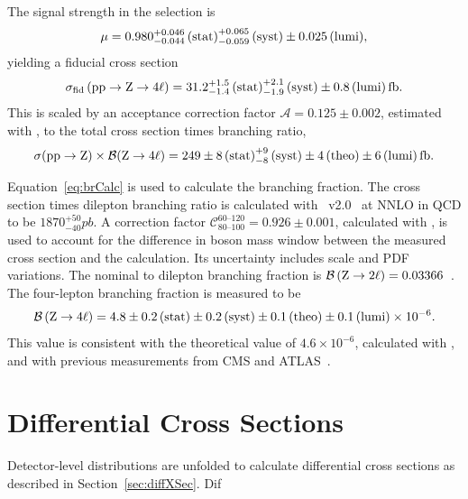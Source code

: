The signal strength in the {\Zfourl} selection is
\begin{equation}
  \mu = 0.980 _{-0.044}^{+0.046} \,\text{(stat)} _{-0.059}^{+0.065} \,\text{(syst)} \pm 0.025 \,\text{(lumi)},
\end{equation}
yielding a fiducial cross section
\begin{equation}
  \sigma_\text{fid}\left(\mathrm{p}\mathrm{p} \to \mathrm{Z} \to 4\ell\right) = 31.2 _{-1.4}^{+1.5} \,\text{(stat)} _{-1.9}^{+2.1} \,\text{(syst)} \pm 0.8 \,\text{(lumi)} \mathrm{\,fb}.
\end{equation}
This is scaled by an acceptance correction factor $\mathcal{A} = 0.125 \pm 0.002$, estimated with {\POWHEG}, to the total {\Zfourl} cross section times branching ratio,
\begin{equation}
  \sigma(\mathrm{p}\mathrm{p} \to \mathrm{Z}) \times \mathcal{B}(\mathrm{Z} \to 4\ell) = 249 \pm 8 \,\text{(stat)} ^{+9}_{-8} \,\text{(syst)} \pm 4 \,\text{(theo)} \pm 6 \,\text{(lumi)} \mathrm{\,fb}.
\end{equation}

Equation~\ref{eq:brCalc} is used to calculate the branching fraction.
The {\PZ} cross section times dilepton branching ratio is calculated with {\FEWZ}~v2.0~\cite{Gavin:2010az} at NNLO in QCD to be $1870 ^{+50}_{-40}\unit{pb}$.
A correction factor $\mathcal{C}^{\text{60--120}}_{\text{80--100}} = 0.926 \pm 0.001$, calculated with {\POWHEG}, is used to account for the difference in {\PZ} boson mass window between the measured {\Zfourl} cross section and the {\FEWZ} calculation.
Its uncertainty includes scale and PDF variations.
The nominal {\PZ} to dilepton branching fraction is $\mathcal{B}\left( \mathrm{Z} \to 2\ell \right) = 0.03366$~\cite{Olive:2016xmw}.
The four-lepton branching fraction is measured to be
\begin{equation}
  \mathcal{B}\left(\mathrm{Z} \to 4\ell\right) = 4.8 \pm 0.2 \,\text{(stat)} \pm 0.2 \,\text{(syst)} \pm 0.1 \,\text{(theo)} \pm 0.1 \,\text{(lumi)} \times 10^{-6}.
\end{equation}
This value is consistent with the theoretical value of $4.6 \times 10^{-6}$, calculated with {\MGAMC}, and with previous measurements from CMS and ATLAS~\cite{CMS:2012bw,Khachatryan:2016txa,Aad:2014wra}.



\section{Differential Cross Sections}

Detector-level distributions are unfolded to calculate differential cross sections as described in Section~\ref{sec:diffXSec}.
Dif

